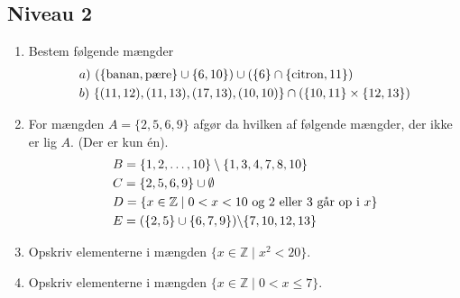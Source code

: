 \documentclass[12pt]{article}
\begin{document}
\subsection*{Niveau 2}
\begin{enumerate}[label=\roman*)]
	\item Bestem følgende mængder
	\begin{align*}
		&a) \  (\{\textnormal{banan},\textnormal{pære}\} \cup \{6,10\}) \cup (\{6\} \cap \{\textnormal{citron},11\})   \\ 
		&b)  \  \{(11,12),(11,13),(17,13),(10,10)\} \cap (\{10,11\} \times \{12,13\})    \\
	\end{align*}
	
	\item For mængden $A = \{2,5,6,9\}$ afgør da hvilken af følgende mængder, der ikke er lig $A$. (Der er kun én).
	\begin{align*}
		&B = \{1,2,\hdots,10\} \setminus \{1,3,4,7,8,10\}\\
		&C = \{2,5,6,9\} \cup \emptyset \\
		&D = \{x \in \mathbb{Z} \mid 0 < x < 10 \textnormal{ og 2 eller 3 går op i }x \} \\
		&E = (\{2,5\} \cup \{6,7,9\}) \backslash \{7,10,12,13\} 
	\end{align*}	 
	\item Opskriv elementerne i mængden $\{x \in \mathbb{Z} \mid x^2 < 20 \}$.
	\item Opskriv elementerne i mængden $\{x \in \mathbb{Z} \mid 0 < x \leq 7 \} $.
\end{enumerate}

\newpage
\end{document}
